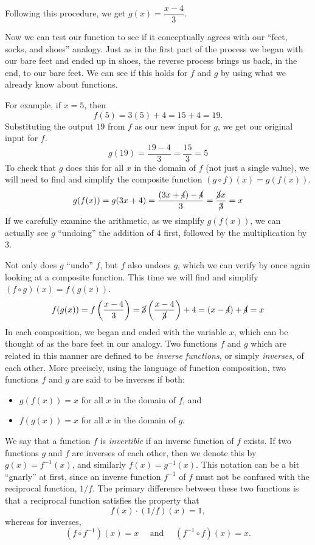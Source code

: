 \documentclass[12pt]{book}
\theoremstyle{definition}
\begin{document}
Following this procedure, we get $g(x) = \dfrac{x-4}{3}$.\par
Now we can test our function to see if it conceptually agrees with our ``feet, socks, and shoes'' analogy.  Just as in the first part of the process we began with our bare feet and ended up in shoes, the reverse process brings us back, in the end, to our bare feet.  We can see if this holds for $f$ and $g$ by using what we already know about functions.\par
For example, if $x=5$, then $$f(5) = 3(5)+4 = 15+4 = 19.$$
Substituting the output $19$ from $f$ as our new input for $g$, we get our original input for $f$.
$$g(19) = \dfrac{19-4}{3} = \dfrac{15}{3} = 5$$
To check that $g$ does this for all $x$ in the domain of $f$ (not just a single value), we will need to find and simplify the composite function $(g\circ f)(x)=g(f(x))$.
$$g(f(x)) = g(3x+4) = \dfrac{(3x+\cancel{4})-\cancel{4}}{3} = \dfrac{\cancel{3}x}{\cancel{3}} = x$$
If we carefully examine the arithmetic, as we simplify $g(f(x))$, we can actually see $g$ ``undoing'' the addition of $4$ first, followed by the multiplication by $3$.\par
Not only does $g$ ``undo'' $f$, but $f$ also undoes $g$, which we can verify by once again looking at a composite function.  This time we will find and simplify $(f\circ g)(x)=f(g(x))$.
$$f(g(x)) = f\left(\dfrac{x-4}{3}\right) = \cancel{3} \left(\dfrac{x-4}{\cancel{3}}\right) + 4 = (x-\cancel{4}) + \cancel{4} = x$$
In each composition, we began and ended with the variable $x$, which can be thought of as the bare feet in our analogy.  Two functions $f$ and $g$ which are related in this manner are defined to be {\it inverse functions}, or simply {\it inverses}, of each other.  More precisely, using the language of function composition, two functions $f$ and $g$ are said to be inverses if both:
\begin{itemize}
	\item $g(f(x)) = x$ for all $x$ in the domain of $f$, and 
	\item $f(g(x)) = x$ for all $x$ in the domain of $g$.
\end{itemize}
We say that a function $f$ is {\it invertible} if an inverse function of $f$ exists.  If two functions $g$ and $f$ are inverses of each other, then we denote this by $g(x)=f^{-1}(x)$, and similarly $f(x)=g^{-1}(x)$.  This notation can be a bit ``gnarly'' at first, since an inverse function $f^{-1}$ of $f$ must not be confused with the reciprocal function, $1/f$.  The primary difference between these two functions is that a reciprocal function satisfies the property that $$f(x)\cdot (1/f)(x)=1,$$ whereas for inverses, $$(f\circ f^{-1})(x)=x \text{~~~~and~~~~} (f^{-1}\circ f)(x)=x.$$
\end{document}
